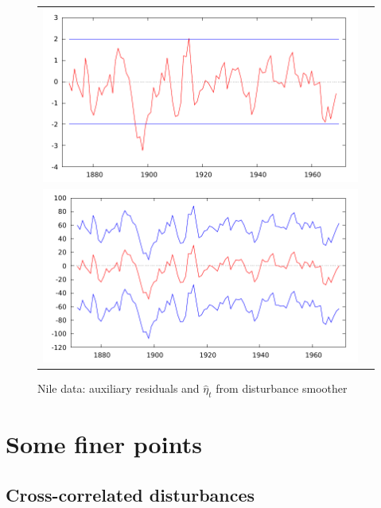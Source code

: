 \documentclass[a4paper]{article}
\begin{document}
\begin{figure}[htbp]
  \centering
  \begin{tabular}{cc}
  \small
    \includegraphics{figures/nile_eta_ksd} \\[10pt]
  \includegraphics{figures/nile_eta_dk}
  \end{tabular}
  \caption{Nile data: auxiliary residuals and $\hat{\eta}_t$
    from disturbance smoother}
  \label{fig:nile}
\end{figure}

\section{Some finer points}
\label{sec:finer}

\subsection{Cross-correlated disturbances}
\label{sec:crossd}
\end{document}
